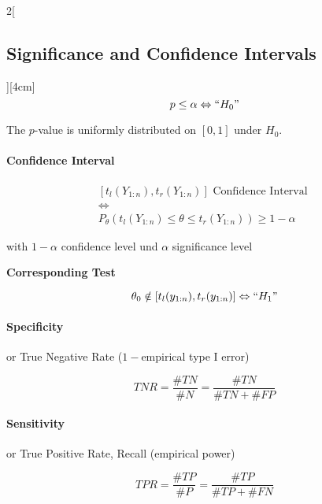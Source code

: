 \documentclass[8pt]{extarticle}
\begin{document}
\begin{multicols}{2}[\subsection{Significance and Confidence Intervals}][4cm]
$$p\leq \alpha \Leftrightarrow ``H_0"$$

\noindent The $p$-value is uniformly distributed on $[0,1]$ under $H_0$.




\paragraph{Confidence Interval}
$$\begin{gathered}
\left[t_l(Y_{1:n}),t_r(Y_{1:n})\right] \text{ Confidence Interval } \\
\Leftrightarrow \\
P_\theta\left(t_l(Y_{1:n}) {\leq} \theta {\leq} t_r(Y_{1:n})\right) \geq 1{-}\alpha
\end{gathered}$$


\noindent with $1-\alpha$ confidence level und $\alpha$ significance level
\vspace{0.5em}

\textbf{Corresponding Test}

$$\theta_0 \notin \left[t_l(y_{1:n}), t_r(y_{1:n})\right] \Leftrightarrow ``H_1"$$



\paragraph{Specificity}  or True Negative Rate ($1 -$empirical type I error)

$$TNR = \frac{\#TN}{\#N} = \frac{\#TN}{\#TN + \#FP}$$

\paragraph{Sensitivity}  or True Positive Rate, Recall (empirical power)

$$TPR = \frac{\#TP}{\#P} = \frac{\#TP}{\#TP + \#FN}$$

\end{multicols}
\end{document}
